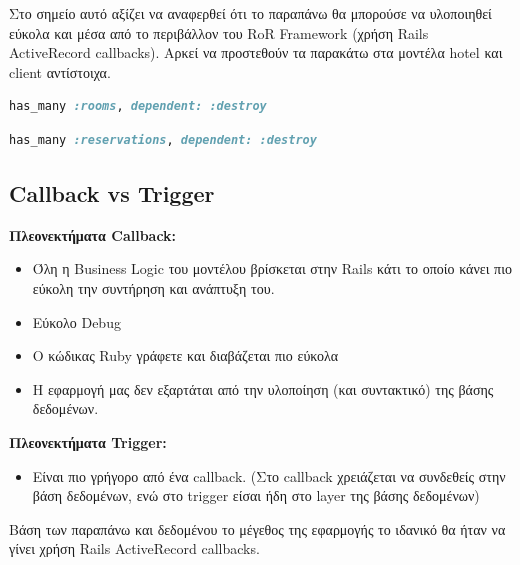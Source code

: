 \documentclass[a4paper,12pt]{article}
\begin{document}
Στο σημείο αυτό αξίζει να αναφερθεί ότι το παραπάνω θα μπορούσε να υλοποιηθεί εύκολα και μέσα από το περιβάλλον του RoR Framework (χρήση Rails ActiveRecord callbacks). Αρκεί να προστεθούν τα παρακάτω στα μοντέλα hotel και client αντίστοιχα.

\begin{lstlisting}[language=Ruby]
has_many :rooms, dependent: :destroy
\end{lstlisting}

\begin{lstlisting}[language=Ruby]
has_many :reservations, dependent: :destroy
\end{lstlisting}

\subsection{Callback vs Trigger}
	\textbf{Πλεονεκτήματα Callback:}
	\begin{itemize}
	  \item Όλη η Business Logic του μοντέλου βρίσκεται στην Rails κάτι το οποίο κάνει πιο εύκολη την συντήρηση και ανάπτυξη του.
	  \item Εύκολο Debug
	  \item Ο κώδικας Ruby γράφετε και διαβάζεται πιο εύκολα
	  \item Η εφαρμογή μας δεν εξαρτάται από την υλοποίηση (και συντακτικό) της βάσης δεδομένων.
	\end{itemize}
	\textbf{Πλεονεκτήματα Trigger:}
	\begin{itemize}
	  \item Είναι πιο γρήγορο από ένα callback. (Στο callback χρειάζεται να συνδεθείς στην βάση δεδομένων, ενώ στο trigger είσαι ήδη στο layer της βάσης δεδομένων)
	\end{itemize}
	Βάση των παραπάνω και δεδομένου το μέγεθος της εφαρμογής το ιδανικό θα ήταν να γίνει χρήση Rails ActiveRecord callbacks.
\end{document}
